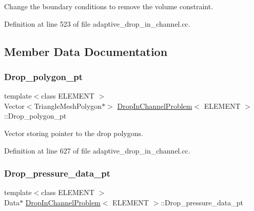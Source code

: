 Change the boundary conditions to remove the volume constraint. 



Definition at line 523 of file adaptive\+\_\+drop\+\_\+in\+\_\+channel.\+cc.



\subsection{Member Data Documentation}
\mbox{\label{classDropInChannelProblem_abccd5c5d075bf179150c3d0df25dcea9}} 
\subsubsection{\texorpdfstring{Drop\+\_\+polygon\+\_\+pt}{Drop\_polygon\_pt}}
{\footnotesize\ttfamily template$<$class E\+L\+E\+M\+E\+NT $>$ \\
Vector$<$Triangle\+Mesh\+Polygon$\ast$$>$ \hyperlink{classDropInChannelProblem}{Drop\+In\+Channel\+Problem}$<$ E\+L\+E\+M\+E\+NT $>$\+::Drop\+\_\+polygon\+\_\+pt\hspace{0.3cm}{\ttfamily [private]}}



Vector storing pointer to the drop polygons. 



Definition at line 627 of file adaptive\+\_\+drop\+\_\+in\+\_\+channel.\+cc.

\mbox{\label{classDropInChannelProblem_ada417f705745bf3e6612f5a9a0a5ef78}} 
\subsubsection{\texorpdfstring{Drop\+\_\+pressure\+\_\+data\+\_\+pt}{Drop\_pressure\_data\_pt}}
{\footnotesize\ttfamily template$<$class E\+L\+E\+M\+E\+NT $>$ \\
Data$\ast$ \hyperlink{classDropInChannelProblem}{Drop\+In\+Channel\+Problem}$<$ E\+L\+E\+M\+E\+NT $>$\+::Drop\+\_\+pressure\+\_\+data\+\_\+pt\hspace{0.3cm}{\ttfamily [private]}}



